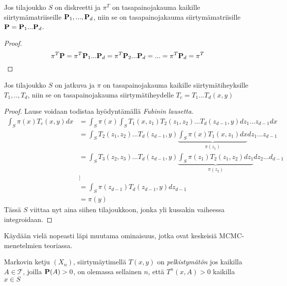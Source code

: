 \begin{lause}\label{cyclic-kernel}
	Jos tilajoukko $S$ on diskreetti ja $\pi^T$ on tasapainojakauma kaikille siirtymämatriiseille $\textbf{P}_1,...,\textbf{P}_d$, niin se on tasapainojakauma siirtymämatriisille $\textbf{P} = \textbf{P}_1...\textbf{P}_d$.
\end{lause}
\begin{proof}
	\begin{equation*}
		\pi^T \textbf{P} = \pi^T \textbf{P}_1...\textbf{P}_d = \pi^T \textbf{P}_2...\textbf{P}_d = ... = \pi^T \textbf{P}_d = \pi^T
	\end{equation*}
\end{proof}

\begin{lause}\label{cyclic-kernel-jatkuva}
	Jos tilajoukko $S$ on jatkuva ja $\pi$ on tasapainojakauma kaikille siirtymätiheyksille $T_1,..,T_d$, niin se on tasapainojakauma siirtymätiheydelle $T_c=T_1...T_d(x,y)$
\end{lause}

\begin{proof}
Lause voidaan todistaa hyödyntämällä \emph{Fubinin lausetta}.
	\begin{equation}
		\begin{split}
			\int_S \pi(x) T_c(x,y)dx &= \int_S \pi(x) \int_ST_1(x,z_1)T_2(z_1,z_2)...T_d(z_{d-1},y)dz_1...z_{d-1}dx \\
			&= \int_S T_2(z_1,z_2)...T_d(z_{d-1},y) \underbrace{\int_S \pi(x) T_1(x,z_1)dx}_{\pi(z_1)} dz_1...z_{d-1}\\
			&= \int_S T_3(z_2,z_3)...T_d(z_{d-1},y) \underbrace{\int_S \pi(z_1)T_2(z_1,z_2)dz_1}_{\pi(z_2)} dz_2...d_{d-1} \\
			& \vdots \\
			&= \int_S \pi(z_{d-1})T_d(z_{d-1},y)dz_{d-1} \\
			&= \pi(y)
		\end{split}
	\end{equation}
	Tässä $S$ viittaa nyt aina siihen tilajoukkoon, jonka yli kussakin vaiheessa integroidaan.
	
\end{proof}


Käydään vielä nopeasti läpi muutama ominaisuus, jotka ovat keskeisiä MCMC-menetelmien teoriassa. \cite{monte_carlo_book, koistinen_computational_2009}

\begin{maar}
	Markovin ketju $(X_n)$, siirtymäytimellä $T(x,y)$ on \textit{pelkistymätön} jos kaikilla $A \in \mathcal{T}$, joilla $\textbf{P}(A)>0$, on olemassa sellainen $n$, että $T^n(x, A)>0$ kaikilla $x\in S$
\end{maar} 

